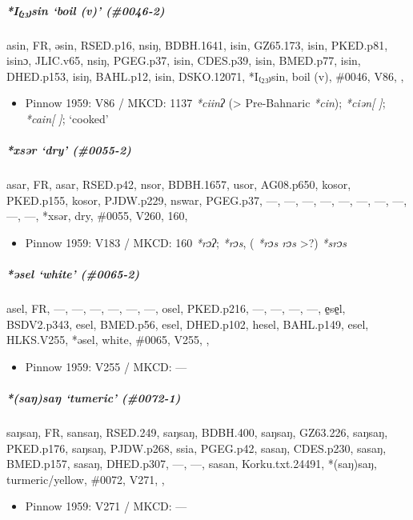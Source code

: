 \documentclass[a4paper,]{article}
\providecommand{\tightlist}{%
  \setlength{\itemsep}{0pt}\setlength{\parskip}{0pt}}
\let\oldsubparagraph\subparagraph
\renewcommand{\subparagraph}[1]{\oldsubparagraph{#1}\mbox{}}
\begin{document}
\subparagraph{\texorpdfstring{\emph{*I₍₂₃₎sin} `boil (v)'
(\#0046-2)}{*I₍₂₃₎sin boil (v) (\#0046-2)}}\label{isin-boil-v-0046-2}

asin, FR, əsin, RSED.p16, nsiŋ, BDBH.1641, isin, GZ65.173, isin,
PKED.p81, isinɔ, JLIC.v65, nsiŋ, PGEG.p37, isin, CDES.p39, isin,
BMED.p77, isin, DHED.p153, isiŋ, BAHL.p12, isin, DSKO.12071, *I₍₂₃₎sin,
boil (v), \#0046, V86, ,

\begin{itemize}
\tightlist
\item
  Pinnow 1959: V86 / MKCD: 1137 \emph{*ciinʔ} (\textgreater{}
  Pre-Bahnaric \emph{*cin}); \emph{*ciən{[} {]}}; \emph{*cain{[} {]}};
  `cooked'
\end{itemize}

\subparagraph{\texorpdfstring{\emph{*xsər} `dry'
(\#0055-2)}{*xsər dry (\#0055-2)}}\label{xsux259r-dry-0055-2}

asar, FR, asar, RSED.p42, nsor, BDBH.1657, usor, AG08.p650, kosor,
PKED.p155, kosor, PJDW.p229, nswar, PGEG.p37, ---, ---, ---, ---, ---,
---, ---, ---, ---, ---, *xsər, dry, \#0055, V260, 160,

\begin{itemize}
\tightlist
\item
  Pinnow 1959: V183 / MKCD: 160 \emph{*rɔʔ}; \emph{*rɔs}, ( \emph{*rɔs
  rɔs} \textgreater{}?) \emph{*srɔs}
\end{itemize}

\subparagraph{\texorpdfstring{\emph{*əsel} `white'
(\#0065-2)}{*əsel white (\#0065-2)}}\label{ux259sel-white-0065-2}

asel, FR, ---, ---, ---, ---, ---, ---, osel, PKED.p216, ---, ---, ---,
---, e̠se̠l, BSDV2.p343, esel, BMED.p56, esel, DHED.p102, hesel,
BAHL.p149, esel, HLKS.V255, *əsel, white, \#0065, V255, ,

\begin{itemize}
\tightlist
\item
  Pinnow 1959: V255 / MKCD: ---
\end{itemize}

\subparagraph{\texorpdfstring{\emph{*(saŋ)saŋ} `tumeric'
(\#0072-1)}{*(saŋ)saŋ tumeric (\#0072-1)}}\label{saux14bsaux14b-tumeric-0072-1}

saŋsaŋ, FR, sansaŋ, RSED.249, saŋsaŋ, BDBH.400, saŋsaŋ, GZ63.226,
saŋsaŋ, PKED.p176, saŋsaŋ, PJDW.p268, ssia, PGEG.p42, sasaŋ, CDES.p230,
sasaŋ, BMED.p157, sasaŋ, DHED.p307, ---, ---, sasan, Korku.txt.24491,
*(saŋ)saŋ, turmeric/yellow, \#0072, V271, ,

\begin{itemize}
\tightlist
\item
  Pinnow 1959: V271 / MKCD: ---
\end{itemize}
\end{document}

